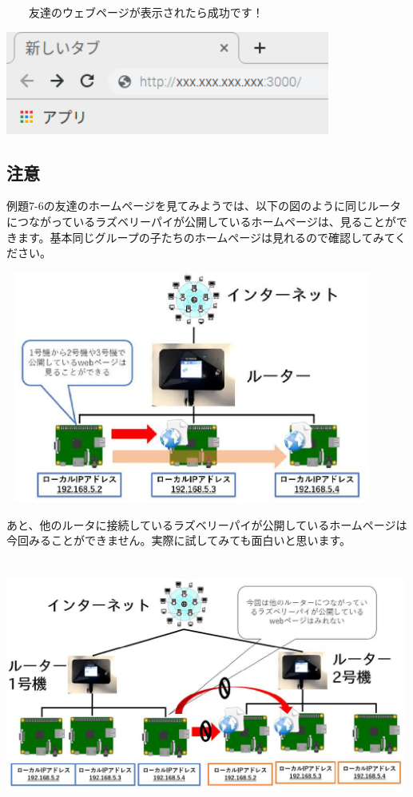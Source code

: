 \documentclass[a4paper,12pt,dvipdfmx]{jarticle}
\begin{document}
　\ \ 友達のウェブページが表示されたら成功です！


\bigskip


\centering
\includegraphics[width=10.659cm,height=3.387cm]{ome7-img043.png}
\flushleft

\clearpage\subsection*{\bfseries
注意}

例題7-6の友達のホームページを見てみようでは、以下の図のように同じルータにつながっているラズベリーパイが公開しているホームページは、見ることができます。基本同じグループの子たちのホームページは見れるので確認してみてください。

\centering
\includegraphics[width=12.284cm,height=7.632cm]{ome7-img044}
\flushleft


\bigskip


\bigskip



あと、他のルータに接続しているラズベリーパイが公開しているホームページは今回みることができません。実際に試してみても面白いと思います。


\bigskip

\centering
\includegraphics[width=13.166cm,height=8.239cm]{ome7-img045}
\flushleft
\end{document}
